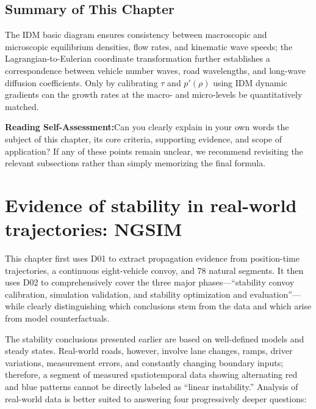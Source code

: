 \documentclass[11pt,a4paper,openany]{book}
\numberwithin{equation}{chapter}
\numberwithin{figure}{chapter}
\numberwithin{table}{chapter}
\newcommand{\sectionwrapup}[1]{%
  \section{Summary of This Chapter}
  \begin{tcolorbox}[summarybox,title=\textbf{Chapter Review}]
  #1
  \par\smallskip
  \textbf{Reading Self-Assessment:}Can you clearly explain in your own words the subject of this chapter, its core criteria, supporting evidence, and scope of application? If any of these points remain unclear, we recommend revisiting the relevant subsections rather than simply memorizing the final formula.
\end{tcolorbox}
  \clearpage
}
\newcommand{\chapterguide}[2]{%
  \begin{tcolorbox}[chapterguide,title=\textbf{Chapter Guide: #1}]
  #2
  \end{tcolorbox}}
\begin{document}
\sectionwrapup{The IDM basic diagram ensures consistency between macroscopic and microscopic equilibrium densities, flow rates, and kinematic wave speeds; the Lagrangian-to-Eulerian coordinate transformation further establishes a correspondence between vehicle number waves, road wavelengths, and long-wave diffusion coefficients. Only by calibrating $\tau$ and $p'(\rho)$ using IDM dynamic gradients can the growth rates at the macro- and micro-levels be quantitatively matched.}

\chapter{Evidence of stability in real-world trajectories: NGSIM}
\label{sec:ngsim}
\chapterguide{How to Effectively Utilize Real-World Trajectories for Stability Modeling and Decision-Making}{




This chapter first uses D01 to extract propagation evidence from position-time trajectories, a continuous eight-vehicle convoy, and 78 natural segments. It then uses D02 to comprehensively cover the three major phases—“stability convoy calibration, simulation validation, and stability optimization and evaluation”—while clearly distinguishing which conclusions stem from the data and which arise from model counterfactuals.
}










The stability conclusions presented earlier are based on well-defined models and steady states. Real-world roads, however, involve lane changes, ramps, driver variations, measurement errors, and constantly changing boundary inputs; therefore, a segment of measured spatiotemporal data showing alternating red and blue patterns cannot be directly labeled as “linear instability.” Analysis of real-world data is better suited to answering four progressively deeper questions:
\end{document}
